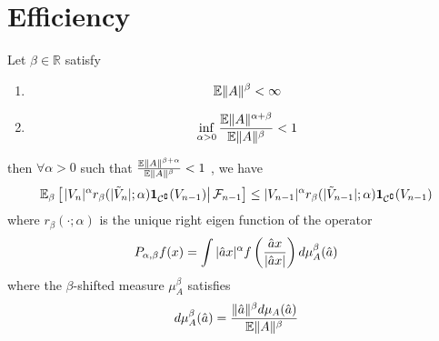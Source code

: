\documentclass{article}
\begin{document}
\section{Efficiency}\label{sec:efficiency}
\begin{lemma}
  Let $\beta \in \mathbb R$ satisfy
  \begin{enumerate}
  \item
    \begin{equation}
      \label{eq:drift_cond1}
      \mathbb{E} \|A\|^\beta < \infty      
    \end{equation}
  \item 
    \begin{equation}
      \label{eq:drift_cond2}
    \inf_{\alpha > 0} {\mathbb{E} \|A\|^{\alpha + \beta}
      \over 
      \mathbb{E} \|A\|^{\beta}
    } < 1
    \end{equation}
  \end{enumerate}
  then $\forall \alpha > 0$ such that $\frac{\mathbb{E}\|A\|^{\beta +
      \alpha}}{\mathbb{E}\|A\|^\beta} < 1$ , we have
  \begin{equation}
    \label{eq:drift}
    \mathbb{E}_\beta \left[\left.
        |V_n|^\alpha r_\beta(|\tilde V_n|; \alpha) \mathbf{1}_{{\mathcal C}^\complement}(V_{n-1}) \right|
      \mathcal F_{n-1} \right] \leq |V_{n-1}|^\alpha r_\beta(|\tilde
    V_{n-1}|; \alpha) \mathbf{1}_{{\mathcal C}^\complement}(V_{n-1})
  \end{equation}
  where $r_\beta(\cdot; \alpha)$ is the unique right eigen function of the
  operator
  \[
  P_{\alpha, \beta} f(x) = \int |\hat a x|^\alpha f\left(
    {\hat a x \over |\hat a x|}
  \right) d\mu_A^\beta(\hat a)
  \]
  where the $\beta$-shifted measure $\mu_A^\beta$ satisfies
  \[
  d\mu_A^\beta(\hat a) = {\|\hat a\|^\beta d\mu_A(\hat a) \over \mathbb{E}\|A\|^\beta}
  \]
\end{lemma}
\end{document}
